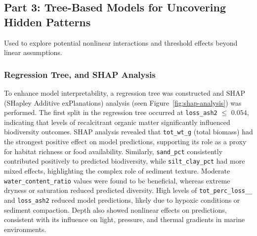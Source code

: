 \documentclass[12pt]{article}
\begin{document}

\subsection{Part 3:  Tree-Based Models for Uncovering Hidden Patterns}

\qquad Used to explore potential nonlinear interactions and threshold effects beyond linear assumptions.

\subsubsection{Regression Tree, and SHAP Analysis}

\qquad To enhance model interpretability, a regression tree was constructed and SHAP (SHapley Additive exPlanations) analysis (seen Figure~\ref{fig:shap-analysis}) was performed. The first split in the regression tree occurred at \texttt{loss\_ash2} $\leq$ $0.054$, indicating that levels of recalcitrant organic matter significantly influenced biodiversity outcomes. SHAP analysis revealed that \texttt{tot\_wt\_g} (total biomass) had the strongest positive effect on model predictions, supporting its role as a proxy for habitat richness or food availability. Similarly, \texttt{sand\_pct} consistently contributed positively to predicted biodiversity, while \texttt{silt\_clay\_pct} had more mixed effects, highlighting the complex role of sediment texture. Moderate \texttt{water\_content\_ratio} values were found to be beneficial, whereas extreme dryness or saturation reduced predicted diversity. High levels of \texttt{tot\_perc\_loss\_\_} and \texttt{loss\_ash2} reduced model predictions, likely due to hypoxic conditions or sediment compaction. Depth also showed nonlinear effects on predictions, consistent with its influence on light, pressure, and thermal gradients in marine environments.
\end{document}
